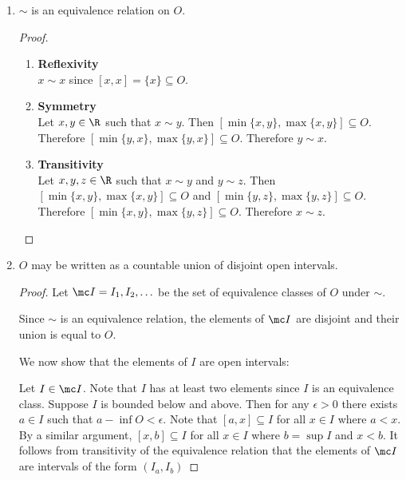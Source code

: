 \begin{enumerate}[label=(1.\arabic*)]
\item
  \begin{claim*}
    $\sim$ is an equivalence relation on $O$.
  \end{claim*}
  \begin{proof}
    \begin{enumerate}
    \item {\bf Reflexivity}\\
      $x \sim x$ since $[x, x] = \{x\} \subseteq O$.

    \item {\bf Symmetry}\\
      Let $x, y \in \R$ such that $x \sim y$. Then $[\min\{x, y\}, \max\{x, y\}] \subseteq O$.
      Therefore $[\min\{y, x\}, \max\{y, x\}] \subseteq O$. Therefore $y \sim x$.

    \item {\bf Transitivity}\\
      Let $x, y, z \in \R$ such that $x \sim y$ and $y \sim z$. Then $[\min\{x, y\}, \max\{x, y\}] \subseteq O$
      and $[\min\{y, z\}, \max\{y, z\}] \subseteq O$. Therefore $[\min\{x, y\}, \max\{y, z\}] \subseteq O$.
      Therefore $x \sim z$.
    \end{enumerate}
  \end{proof}

\item
  \begin{claim*}
    $O$ may be written as a countable union of disjoint open intervals.
  \end{claim*}

  \begin{proof}
    Let $\mc I = I_1, I_2, \ldots$ be the set of equivalence classes of $O$ under $\sim$.

    Since $\sim$ is an equivalence relation, the elements of $\mc I$ are disjoint and their union is equal
    to $O$.

    We now show that the elements of $I$ are open intervals:

    Let $I \in \mc I$. Note that $I$ has at least two elements since $I$ is an equivalence class. Suppose $I$
    is bounded below and above. Then for any $\epsilon > 0$ there exists $a \in I$ such
    that $a - \inf O < \epsilon$. Note that $[a, x] \subseteq I$ for all $x \in I$ where $a < x$. By a similar
    argument, $[x, b] \subseteq I$ for all $x \in I$ where $b = \sup I$ and $x < b$. It follows from
    transitivity of the equivalence relation that the elements of $\mc I$ are intervals of the
    form $(I_a, I_b)$


\end{proof}
\end{enumerate}
